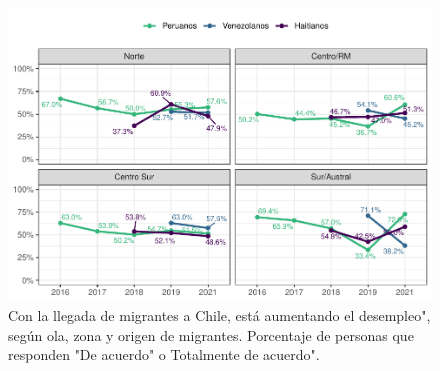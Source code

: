 \documentclass[
  12pt,
]{book}
\begin{document}
\begin{figure}

{\centering \includegraphics{reporte-elsoc_files/figure-latex/amen1-zona-1} 

}

\caption{Con la llegada de migrantes a Chile, está aumentando el desempleo", según ola, zona y origen de migrantes. Porcentaje de personas que responden "De acuerdo" o Totalmente de acuerdo".}\label{fig:amen1-zona}
\end{figure}
\end{document}
